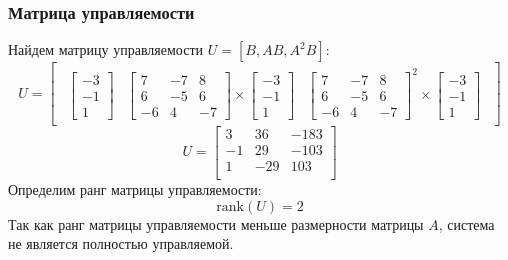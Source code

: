 \subsubsection{Матрица управляемости}
Найдем матрицу управляемости $U = [B, AB, A^2B]$:
\begin{equation}
    U = \begin{bmatrix} 
        \begin{array}{c|c|c}
            \begin{bmatrix}
                -3 \\
                -1 \\
                1
            \end{bmatrix} & 
            \begin{bmatrix}
                7 & -7 & 8 \\
                6 & -5 & 6 \\
                -6 & 4 & -7
            \end{bmatrix} \times 
            \begin{bmatrix}
                -3 \\
                -1 \\
                1
            \end{bmatrix} &
            \begin{bmatrix}
                7 & -7 & 8 \\
                6 & -5 & 6 \\
                -6 & 4 & -7
            \end{bmatrix}^2 \times
            \begin{bmatrix}
                -3 \\
                -1 \\
                1
            \end{bmatrix}
        \end{array}   
    \end{bmatrix}
\end{equation}
\begin{equation}
    U = \begin{bmatrix}
    3 & 36 & -183 \\ 
    -1 & 29 & -103 \\ 
    1 & -29 & 103 \\ 
    \end{bmatrix}
\end{equation}
Определим ранг матрицы управляемости:
\begin{equation}
    \text{rank}(U) = 2
\end{equation}
Так как ранг матрицы управляемости меньше размерности матрицы $A$, система не является полностью управляемой. 

